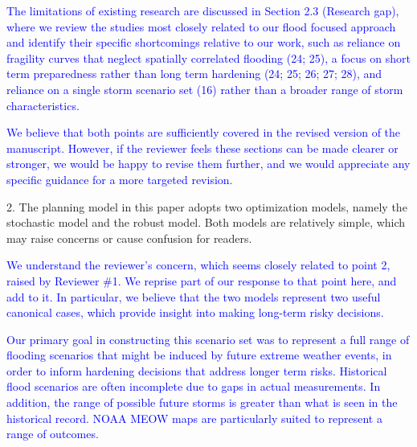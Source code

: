 \documentclass[authoryear,preprint,review,12pt]{elsarticle}\usepackage{amssymb}
\begin{document}
\textcolor{blue}{The limitations of existing research are discussed in Section 2.3 (Research gap), where we review the studies most closely related to our flood focused approach and identify their specific shortcomings relative to our work, such as reliance on fragility curves that neglect spatially correlated flooding (24; 25), a focus on short term preparedness rather than long term hardening (24; 25; 26; 27; 28), and reliance on a single storm scenario set (16) rather than a broader range of storm characteristics.}

\textcolor{blue}{We believe that both points are sufficiently covered in the revised version of the manuscript. However, if the reviewer feels these sections can be made clearer or stronger, we would be happy to revise them further, and we would appreciate any specific guidance for a more targeted revision.}

2. The planning model in this paper adopts two optimization models, namely the stochastic model and the robust model. Both models are relatively simple, which may raise concerns or cause confusion for readers.


\textcolor{blue}{We understand the reviewer's concern, which seems closely related to point 2, raised by Reviewer \#1. We reprise part of our response to that point here, and add to it. In particular, we believe that the two models represent two useful canonical cases, which provide insight into making long-term risky decisions.}

\textcolor{blue}{Our primary goal in constructing this scenario set was to represent a full range of flooding scenarios that might be induced by future extreme weather events, in order to inform hardening decisions that address longer term risks. Historical flood scenarios are often incomplete due to gaps in actual measurements. In addition, the range of possible future storms is greater than what is seen in the historical record. NOAA MEOW maps are particularly suited to represent a range of outcomes.}
\end{document}
